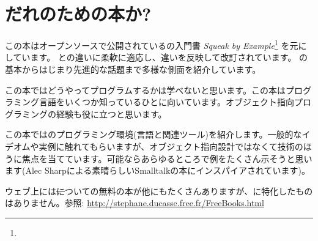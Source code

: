 \documentclass[a4paper,10pt,twoside]{book}
\begin{document}
\section*{だれのための本か?}

この本はオープンソースで公開されている\squeak の入門書 \emph{Squeak by Example}\footnote{\sbe} を元にしています。
\pharo と\squeak の違いに柔軟に適応し、違いを反映して改訂されています。
\pharo の基本からはじまり先進的な話題まで多様な側面を紹介しています。

この本ではどうやってプログラムするかは学べないと思います。この本はプログラミング言語をいくつか知っているひとに向いています。オブジェクト指向プログラミングの経験も役に立つと思います。

この本では\pharo のプログラミング環境(言語と関連ツール)を紹介します。一般的なイデオムや実例に触れてもらいますが、オブジェクト指向設計ではなくて技術のほうに焦点を当てています。可能ならあらゆるところで例をたくさん示そうと思います(Alec Sharpによる素晴らしいSmalltalkの本\cite{Shar97a}にインスパイアされています)。

ウェブ上には\st についての無料の本が他にもたくさんありますが、\pharo に特化したものはありません。参照:
\url{http://stephane.ducasse.free.fr/FreeBooks.html}

\ifluluelse{}{\newpage} %
\end{document}
